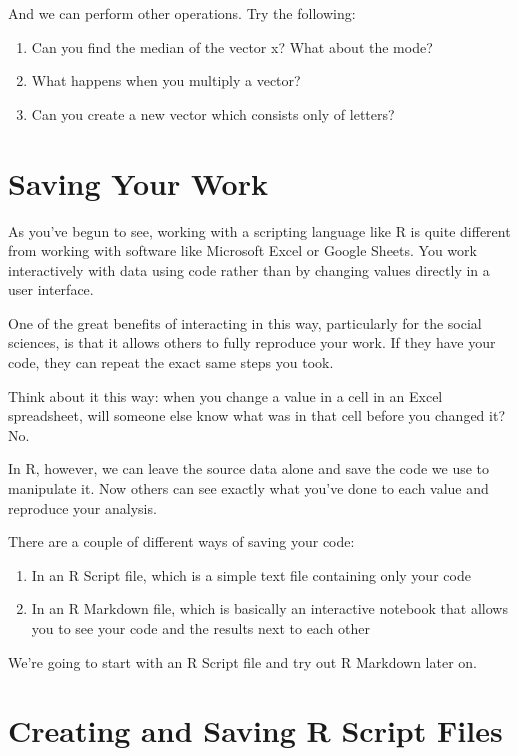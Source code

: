 \documentclass[
]{book}
\begin{document}
And we can perform other operations. Try the following:

\begin{enumerate}
\def\labelenumi{\arabic{enumi}.}
\item
  Can you find the median of the vector x? What about the mode?
\item
  What happens when you multiply a vector?
\item
  Can you create a new vector which consists only of letters?
\end{enumerate}

\hypertarget{saving-your-work}{%
\section{Saving Your Work}\label{saving-your-work}}

As you've begun to see, working with a scripting language like R is quite different from working with software like Microsoft Excel or Google Sheets. You work interactively with data using code rather than by changing values directly in a user interface.

One of the great benefits of interacting in this way, particularly for the social sciences, is that it allows others to fully reproduce your work. If they have your code, they can repeat the exact same steps you took.

Think about it this way: when you change a value in a cell in an Excel spreadsheet, will someone else know what was in that cell before you changed it? No.

In R, however, we can leave the source data alone and save the code we use to manipulate it. Now others can see exactly what you've done to each value and reproduce your analysis.

There are a couple of different ways of saving your code:

\begin{enumerate}
\def\labelenumi{\arabic{enumi}.}
\item
  In an R Script file, which is a simple text file containing only your code
\item
  In an R Markdown file, which is basically an interactive notebook that allows you to see your code and the results next to each other
\end{enumerate}

We're going to start with an R Script file and try out R Markdown later on.

\hypertarget{creating-and-saving-r-script-files}{%
\section{Creating and Saving R Script Files}\label{creating-and-saving-r-script-files}}
\end{document}
